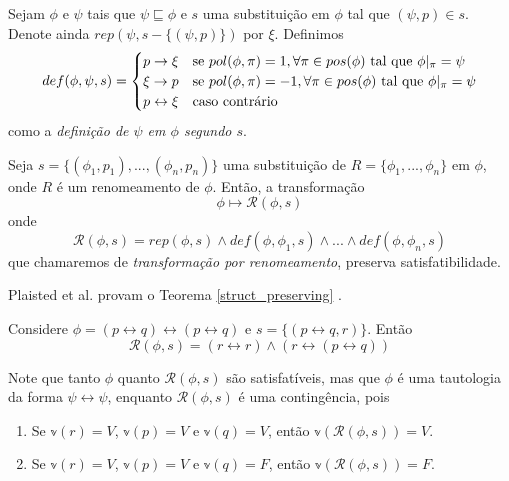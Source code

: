 \begin{definition}
	Sejam $\phi$ e $\psi$ tais que $\psi \sqsubseteq \phi$ e $s$ uma substituição em $\phi$ tal que $(\psi,p) \in s$. Denote ainda $rep(\psi,s-\{(\psi,p)\})$ por $\xi$. Definimos
	\[
	def(\phi,\psi,s) =
	\begin{cases} 
	\hfill p \rightarrow \xi \hfill     & \text{se } pol(\phi,\pi) = 1, \forall \pi \in pos(\phi) \text{ tal que } \phi|_\pi = \psi\\
	\hfill \xi \rightarrow p \hfill     & \text{se } pol(\phi,\pi) = -1, \forall \pi \in pos(\phi) \text{ tal que } \phi|_\pi = \psi\\
	\hfill p \leftrightarrow \xi \hfill & \text{caso contrário}\\
	\end{cases}
	\]
	como a \emph{definição de $\psi$ em $\phi$ segundo $s$}.
\end{definition}

\begin{theorem}
	\label{struct_preserving}
	Seja $s = \{(\phi_1,p_1),...,(\phi_n,p_n) \}$ uma substituição de $R = \{\phi_1,...,\phi_n \}$ em $\phi$, onde $R$ é um renomeamento de $\phi$. Então, a transformação $$\phi \longmapsto \mathcal{R}(\phi,s)$$ onde $$\mathcal{R}(\phi,s) = rep(\phi,s) \wedge def(\phi,\phi_1,s) \wedge ... \wedge def(\phi,\phi_n,s)$$
    que chamaremos de \emph{transformação por renomeamento}, preserva satisfatibilidade.
\end{theorem}

Plaisted et al. provam o Teorema \ref{struct_preserving} \cite{plaisted1986structure}.

\begin{example}
	\label{exemplo_renaming}
    Considere $\phi = (p \leftrightarrow q) \leftrightarrow (p \leftrightarrow q)$ e $s = \{(p \leftrightarrow q, r) \}$. Então $$\mathcal{R}(\phi,s) = (r \leftrightarrow r) \wedge (r \leftrightarrow (p \leftrightarrow q))$$
    
    Note que tanto $\phi$ quanto $\mathcal{R}(\phi,s)$ são satisfatíveis, mas que $\phi$ é uma tautologia da forma $\psi \leftrightarrow \psi$, enquanto $\mathcal{R}(\phi,s)$ é uma contingência, pois
    \begin{enumerate}
    	\item Se $\mathbb{v}(r) = V$, $\mathbb{v}(p) = V$ e $\mathbb{v}(q) = V$, então $\mathbb{v}(\mathcal{R}(\phi,s)) = V$.
    	\item Se $\mathbb{v}(r) = V$, $\mathbb{v}(p) = V$ e $\mathbb{v}(q) = F$, então $\mathbb{v}(\mathcal{R}(\phi,s)) = F$.
    \end{enumerate}
\end{example}

